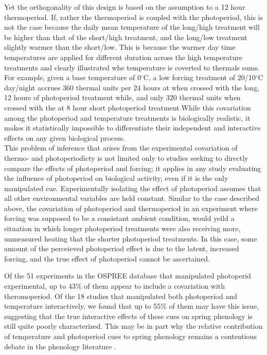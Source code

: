 \documentclass[11pt]{article}
\begin{document}
Yet the orthogonality of this design is based on the assumption to a 12 hour thermoperiod. If, rather the thermoperiod is coupled with the photoperiod, this is not the case because the daily mean temperature of the long/high treatment will be higher than that of the short/high treatment, and the long/low treatment slightly warmer than the short/low.  %
This is because the warmer day time temperatures are applied for different duration across the high temperature treatments and clearly illustrated whe temperature is coverted to thermals sums. For example,  given a base temperature of 0$^{\circ}$C, a low forcing treatment of 20/10$^{\circ}$C day/night accrues 360 thermal units per 24 hours at when crossed with the long, 12 hours of photoperiod treatment while, and only 320 thermal units when crossed with the at 8 hour short photoperiod treatment.While this covariation among the photoperiod and temperature treatments is biologically realistic, it makes it statistically impossible to differentiate their independent and interactive effects on any given biological process.\\

This problem of inference that arises from the experimental covariation of thermo- and photoperiodicty is not limited only to studies seeking to directly compare the effects of photoperiod and forcing; it applies in any study evaluating the influence of photoperiod on biological activity, even if it is the only manipulated cue. Experimentally isolating the effect of photoperiod assumes that all other environmental variables are held constant. Similar to the case described above,%
the covariation of photoperiod and thermoperiod in an experiment where forcing was supposed to be a consistant ambient condition, would yeild a situation in which longer photoperiod treatments were also receiving more, unmeasured heating that the shorter photoperiod treatments. In this case, some amount of the perceieved photoperiod effect is due to the latent, increased forcing, and the true effect of photoperiod cannot be ascertained.

Of the 51 experiments in the OSPREE database that manipulated photoperid experimental, up to 43\% of them appear to include a covariation with theromoperiod. Of the 18 studies that manipulated both photoperiod and temperature interactively, we found that up to 55\% of them may have this issue, suggesting that the true interactive effects of these cues on spring phenology is still quite poorly characterized. This may be in part why the relative contribution of temperature and photoperiod cues to spring phenology remains a contentious debate in the phenology literature \citep{koerner2010a}.
\end{document}
